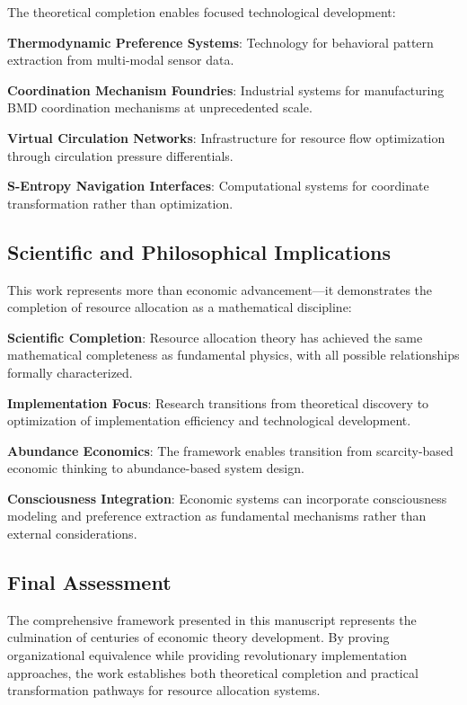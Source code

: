 \documentclass[12pt,a4paper]{article}
\begin{document}
The theoretical completion enables focused technological development:

\textbf{Thermodynamic Preference Systems}: Technology for behavioral pattern extraction from multi-modal sensor data.

\textbf{Coordination Mechanism Foundries}: Industrial systems for manufacturing BMD coordination mechanisms at unprecedented scale.

\textbf{Virtual Circulation Networks}: Infrastructure for resource flow optimization through circulation pressure differentials.

\textbf{S-Entropy Navigation Interfaces}: Computational systems for coordinate transformation rather than optimization.

\subsection{Scientific and Philosophical Implications}

This work represents more than economic advancement—it demonstrates the completion of resource allocation as a mathematical discipline:

\textbf{Scientific Completion}: Resource allocation theory has achieved the same mathematical completeness as fundamental physics, with all possible relationships formally characterized.

\textbf{Implementation Focus}: Research transitions from theoretical discovery to optimization of implementation efficiency and technological development.

\textbf{Abundance Economics}: The framework enables transition from scarcity-based economic thinking to abundance-based system design.

\textbf{Consciousness Integration}: Economic systems can incorporate consciousness modeling and preference extraction as fundamental mechanisms rather than external considerations.

\subsection{Final Assessment}

The comprehensive framework presented in this manuscript represents the culmination of centuries of economic theory development. By proving organizational equivalence while providing revolutionary implementation approaches, the work establishes both theoretical completion and practical transformation pathways for resource allocation systems.
\end{document}
